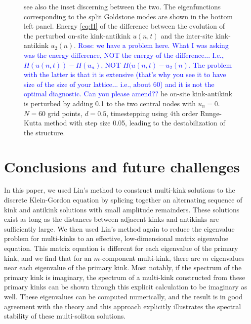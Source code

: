 \documentclass[12pt,reqno]{amsart}
\newcommand{\revisedd}[2]{ \textcolor{blue}{#1} }
\begin{document}
\begin{figure}[H]
{	see also the inset discerning between the two. The eigenfunctions corresponding to the split Goldstone modes are shown in the bottom left panel. Energy \cref{eq:H} of the difference between the evolution of the perturbed on-site kink-antikink $u(n,t)$ and the inter-site kink-antikink $u_2(n)$. 
	\revisedd{Ross: we have a problem here. What I was asking was the energy
	difference, NOT the energy of the difference... I.e., $H(u(n,t))-H(u_n)$, NOT
	$H(u(n,t)-u_2(n)$. The problem with the latter is that it is extensive
	(that's why you see it to have size of the size of your lattice... i.e., about
	60) and it is not the optimal diagnostic. Can you please amend??}
	The on-site kink-antikink is perturbed by adding 0.1 to the two central nodes with $u_n = 0$. $N=60$ grid points, $d = 0.5$, timestepping using 4th order Runge-Kutta method with step size 0.05, leading to the destabilization of the structure.} 
	\label{fig:unstablekak}
\end{figure}

\section{Conclusions and future challenges}\label{sec:conclusions}

In this paper, we used Lin's method to construct multi-kink solutions to the discrete Klein-Gordon equation by splicing together an alternating sequence of kink and antikink solutions with small amplitude remainders. These solutions exist as long as the distances between adjacent kinks and antikinks are sufficiently large. We then used Lin's method again to reduce the eigenvalue problem for multi-kinks to an effective, low-dimensional matrix 
eigenvalue equation. This matrix equation is different for each eigenvalue of the primary kink, and we find that for an $m$-component multi-kink, there are $m$ eigenvalues near each eigenvalue of the primary kink. Most notably, if the spectrum of the primary kink is imaginary, the spectrum of a multi-kink constructed from these primary kinks can be shown through this
explicit calculation to be imaginary as well. These eigenvalues can be computed numerically, and the result is in good agreement with the theory and this approach explicitly illustrates the 
spectral stability of these multi-soliton solutions.
\end{document}
